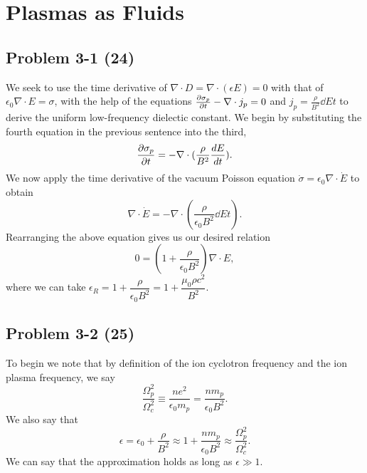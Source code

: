 \chapter{Plasmas as Fluids}
\label{ch:Three}

\section*{Problem 3-1 (24)}
\label{sec:3-1}
We seek to use the time derivative of \(\nabla \cdot D = \nabla \cdot (\epsilon E) = 0 \) with that of \(\epsilon_0\nabla\cdot E= \sigma \), with the help of the equations \(\frac{\partial \sigma_p}{\partial t} -\nabla \cdot j_p = 0 \) and \(j_p = \frac{\rho}{B^2}\dd{E}{t} \) to derive the uniform low-frequency dielectic constant. We begin by substituting the fourth equation in the previous sentence into the third,
\begin{equation*}
	\frac{\partial \sigma_p}{\partial t} = -\nabla\cdot(\dfrac{\rho}{B^2}\frac{d E}{d t}).
\end{equation*}
We now apply the time derivative of the vacuum Poisson equation \(\dot{\sigma} = \epsilon_0\nabla\cdot \dot{E} \) to obtain
\begin{equation*}
	\nabla\cdot \dot{E} = -\nabla\cdot(\dfrac{\rho}{\epsilon_0B^2}\dd{E}{t}).
\end{equation*}
Rearranging the above equation gives us our desired relation
\begin{equation*}
	0 = (1 + \dfrac{\rho}{\epsilon_0B^2})\nabla \cdot E, 
\end{equation*}
where we can take \(\epsilon_R = 1 + \dfrac{\rho}{\epsilon_0B^2} = 1 + \dfrac{\mu_0\rho c^2}{B^2} \).

\section*{Problem 3-2 (25)}
\label{sec:3-2}
To begin we note that by definition of the ion cyclotron frequency and the ion plasma frequency, we say
\begin{equation*}
	\dfrac{\Omega_p^2}{\Omega_c^2} \equiv \dfrac{ne^2}{\epsilon_0m_p} = \dfrac{nm_p}{\epsilon_0B^2}.
\end{equation*}
We also say that 
\begin{equation*}
	\epsilon = \epsilon_0 + \dfrac{\rho}{B^2} \approx 1 + \dfrac{nm_p}{\epsilon_0B^2} \approx \dfrac{\Omega_p^2}{\Omega_c^2}.
\end{equation*}
We can say that the approximation holds as long as \(\epsilon \gg 1 \).

